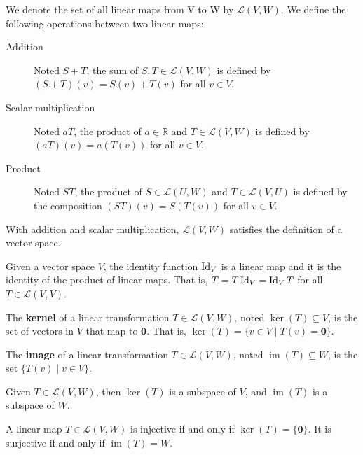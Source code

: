 \documentclass{bareminimum}
\DeclareMathOperator{\im}{im}
\begin{document}
\begin{defn}
	We denote  the set of all linear maps from V to W by $\mathcal{L}(V,W)$. We define the following operations between two linear maps:
	\begin{description}
		\item[Addition] Noted $S + T$, the sum of $S,T \in \mathcal{L}(V,W)$  is defined by $(S+T)(v) = S(v) + T(v)$ for all $v \in V$.
		\item[Scalar multiplication] Noted $aT$, the product of $a \in \mathbb{R}$ and $T \in \mathcal{L}(V,W)$ is defined by $(aT)(v) = a(T(v))$ for all $v \in V$.
		\item[Product] Noted $ST$, the product of $S \in \mathcal{L}(U,W)$ and $T \in \mathcal{L}(V,U)$ is defined by the composition $(ST)(v) = S(T(v))$ for all $v \in V$.
	\end{description}
	With addition and scalar multiplication, $\mathcal{L}(V,W)$ satisfies the definition of a vector space.
\end{defn}

\begin{prop}
	Given a   vector space $V$, the identity function $\operatorname{Id}_{V}$ is a linear map and it is the identity of the product of linear maps. That is, $T = T \operatorname{Id}_{V} = \operatorname{Id}_{V} T$ for all $T \in \mathcal{L}(V,V)$.
\end{prop}

\begin{defn}[Kernel]
	The \textbf{kernel}  of a linear transformation $T \in \mathcal{L}(V,W)$, noted $\ker(T)\subseteq V$, is the set of vectors in $V$ that map to $\mathbf{0}$. That is, $\ker(T) = \{ v \in V \mid T(v) = \mathbf{0} \}$.
\end{defn}

\begin{defn}[Image]
	The \textbf{image} \marginleft{Image: $\im(T)$} of a linear transformation $T \in \mathcal{L}(V,W)$, noted $\im(T) \subseteq W$, is the set $\{ T(v) \mid v \in V \}$. 
\end{defn}

\begin{prop}
	Given $T \in \mathcal{L}(V,W)$, then $\ker(T)$ is a subspace of $V$, and $\im(T)$ is a subspace of $W$.
\end{prop}

\begin{prop}
	A linear map $T \in \mathcal{L}(V,W)$ is injective if and only if $\ker(T) = \{ \mathbf{0} \}$. It is surjective if and only if $\im(T) = W$.
\end{prop}
\end{document}
